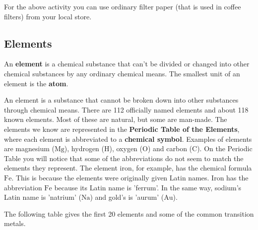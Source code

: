 \par \label{m38708*eip-392}
	\Tip
      {For the above activity you can use ordinary filter paper (that is used in coffee filters) from your local store.}
	\par
      \label{m38708*uid25}
            \subsection*{Elements}
            \nopagebreak
        \label{m38708*id63302}An \textbf{element} is a chemical substance that can't be divided or changed into other chemical substances by any ordinary chemical means. The smallest unit of an element is the \textbf{atom}.\par 
\label{m38708*fhsst!!!underscore!!!id193}
{ \label{m38708*meaningfhsst!!!underscore!!!id193}
An element is a substance that cannot be broken down into other substances through chemical means.} 
        \label{m38708*id63334}There are 112 officially named elements and about 118 known elements. Most of these are natural, but some are man-made. The elements we know are represented in the \textbf{Periodic Table of the Elements}, where each element is abbreviated to a \textbf{chemical symbol}. Examples of elements are magnesium ($\mathrm{Mg}$), hydrogen ($\mathrm{H}$), oxygen ($\mathrm{O}$) and carbon ($\mathrm{C}$). On the Periodic Table you will notice that some of the abbreviations do not seem to match the elements they represent. The element iron, for example, has the chemical formula $\mathrm{Fe}$. This is because the elements were originally given Latin names. Iron has the abbreviation $\mathrm{Fe}$ because its Latin name is 'ferrum'. In the same way, sodium's Latin name is 'natrium' ($\mathrm{Na}$) and gold's is 'aurum' ($\mathrm{Au}$).\par \label{m38708*eip-775}
The following table gives the first 20 elements and some of the common transition metals.\par
